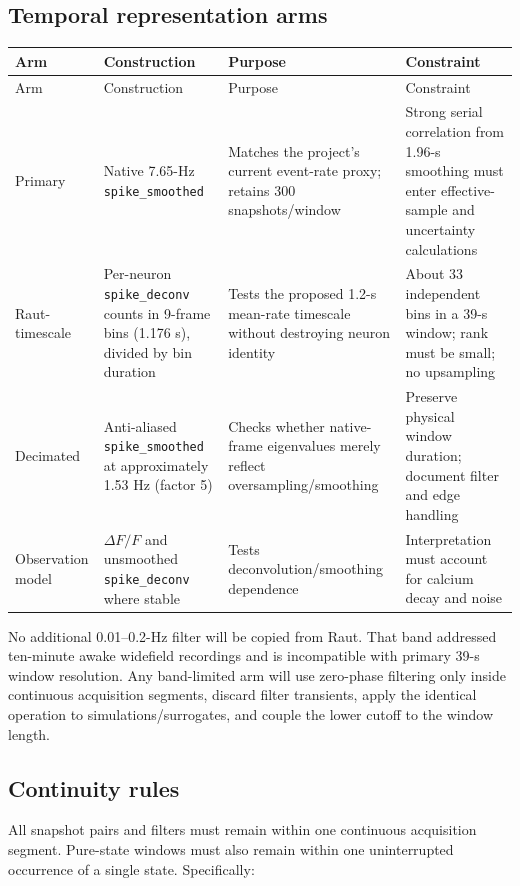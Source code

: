 \documentclass[11pt,a4paper]{article}
\begin{document}
\subsection{Temporal representation arms}

\begin{longtable}{@{}P{0.20\textwidth}P{0.30\textwidth}P{0.22\textwidth}P{0.20\textwidth}@{}}
\toprule
Arm & Construction & Purpose & Constraint\\
\midrule
\endfirsthead
\toprule
Arm & Construction & Purpose & Constraint\\
\midrule
\endhead
Primary & Native 7.65-Hz \texttt{spike\_smoothed} & Matches the project's current event-rate proxy; retains 300 snapshots/window & Strong serial correlation from 1.96-s smoothing must enter effective-sample and uncertainty calculations\\
Raut-timescale & Per-neuron \texttt{spike\_deconv} counts in 9-frame bins (1.176 s), divided by bin duration & Tests the proposed 1.2-s mean-rate timescale without destroying neuron identity & About 33 independent bins in a 39-s window; rank must be small; no upsampling\\
Decimated & Anti-aliased \texttt{spike\_smoothed} at approximately 1.53 Hz (factor 5) & Checks whether native-frame eigenvalues merely reflect oversampling/smoothing & Preserve physical window duration; document filter and edge handling\\
Observation model & $\Delta F/F$ and unsmoothed \texttt{spike\_deconv} where stable & Tests deconvolution/smoothing dependence & Interpretation must account for calcium decay and noise \citep{wei2020,koh2023}\\
\bottomrule
\end{longtable}

No additional 0.01--0.2-Hz filter will be copied from Raut. That band addressed ten-minute awake widefield recordings and is incompatible with primary 39-s window resolution. Any band-limited arm will use zero-phase filtering only inside continuous acquisition segments, discard filter transients, apply the identical operation to simulations/surrogates, and couple the lower cutoff to the window length.

\subsection{Continuity rules}

All snapshot pairs and filters must remain within one continuous acquisition segment. Pure-state windows must also remain within one uninterrupted occurrence of a single state. Specifically:
\end{document}

